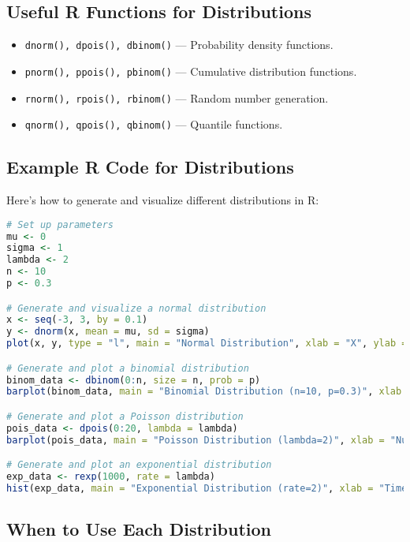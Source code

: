 \subsection{Useful R Functions for Distributions}
\begin{itemize}
    \item \texttt{dnorm(), dpois(), dbinom()} --- Probability density functions.
    \item \texttt{pnorm(), ppois(), pbinom()} --- Cumulative distribution functions.
    \item \texttt{rnorm(), rpois(), rbinom()} --- Random number generation.
    \item \texttt{qnorm(), qpois(), qbinom()} --- Quantile functions.
\end{itemize}

\subsection{Example R Code for Distributions}
Here’s how to generate and visualize different distributions in R:

\begin{lstlisting}[language=R, caption=R Code for Generating and Visualizing Distributions]
# Set up parameters
mu <- 0
sigma <- 1
lambda <- 2
n <- 10
p <- 0.3

# Generate and visualize a normal distribution
x <- seq(-3, 3, by = 0.1)
y <- dnorm(x, mean = mu, sd = sigma)
plot(x, y, type = "l", main = "Normal Distribution", xlab = "X", ylab = "Density")

# Generate and plot a binomial distribution
binom_data <- dbinom(0:n, size = n, prob = p)
barplot(binom_data, main = "Binomial Distribution (n=10, p=0.3)", xlab = "Number of Successes")

# Generate and plot a Poisson distribution
pois_data <- dpois(0:20, lambda = lambda)
barplot(pois_data, main = "Poisson Distribution (lambda=2)", xlab = "Number of Events")

# Generate and plot an exponential distribution
exp_data <- rexp(1000, rate = lambda)
hist(exp_data, main = "Exponential Distribution (rate=2)", xlab = "Time", breaks = 20)
\end{lstlisting}

\subsection{When to Use Each Distribution}

